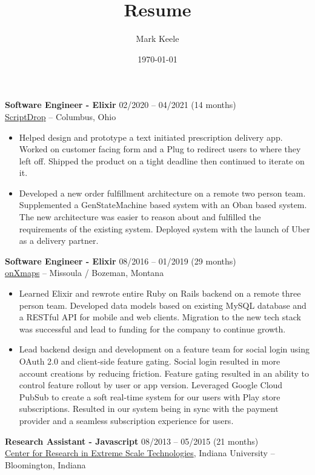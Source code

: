 \documentclass[12pt,letterpaper]{article}
\author{Mark Keele}
\title{Resume}
\date{\today}
\begin{document}
\noindent\textbf{Software Engineer - Elixir}
\hfill{02/2020 -- 04/2021 (14 months)} \\
\href{https://scriptdrop.co/}{ScriptDrop} -- Columbus, Ohio

\begin{itemize}

  \item Helped design and prototype a text initiated prescription delivery app. Worked on customer facing form and a Plug to redirect users to where they left off. Shipped the product on a tight deadline then continued to iterate on it.

  \item Developed a new order fulfillment architecture on a remote two person team. Supplemented a GenStateMachine based system with an Oban based system. The new architecture was easier to reason about and fulfilled the requirements of the existing system. Deployed system with the launch of Uber as a delivery partner.

\end{itemize}

\noindent\textbf{Software Engineer - Elixir}
\hfill{08/2016 -- 01/2019 (29 months)} \\
\href{https://www.onxmaps.com/}{onXmaps} -- Missoula / Bozeman, Montana

\begin{itemize}

  \item Learned Elixir and rewrote entire Ruby on Rails backend on a remote three person team. Developed data models based on existing MySQL database and a RESTful API for mobile and web clients. Migration to the new tech stack was successful and lead to funding for the company to continue growth.

  \item Lead backend design and development on a feature team for social login using OAuth 2.0 and client-side feature gating. Social login resulted in more account creations by reducing friction. Feature gating resulted in an ability to control feature rollout by user or app version. Leveraged Google Cloud PubSub to create a soft real-time system for our users with Play store subscriptions. Resulted in our system being in sync with the payment provider and a seamless subscription experience for users.

\end{itemize}

\noindent\textbf{Research Assistant - Javascript}
\hfill{08/2013 -- 05/2015 (21 months)} \\
\href{https://pti.iu.edu/centers/crest.html}{Center for Research in Extreme Scale Technologies}, Indiana University -- Bloomington, Indiana
\end{document}
